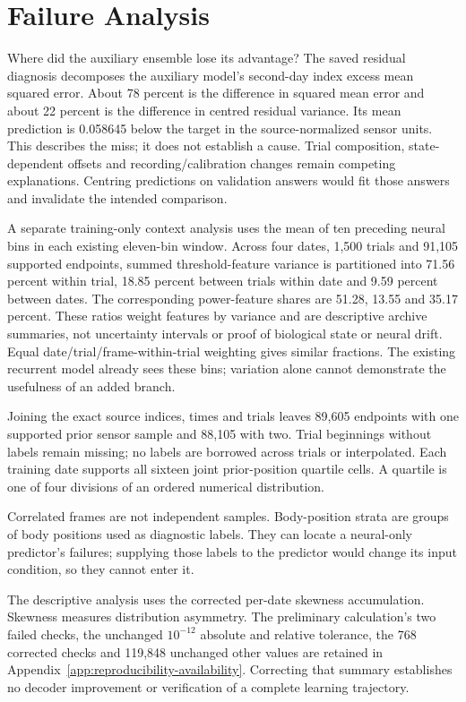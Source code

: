 \section{Failure Analysis}

Where did the auxiliary ensemble lose its advantage? The saved residual diagnosis decomposes the auxiliary model's second-day index
excess mean squared error. About 78 percent is the difference in squared mean
error and about 22 percent is the difference in centred residual variance.
Its mean prediction is 0.058645 below the target in the source-normalized
sensor units. This describes the miss; it does not establish a cause. Trial
composition, state-dependent offsets and recording/calibration changes remain
competing explanations. Centring predictions on validation answers would fit
those answers and invalidate the intended comparison.

A separate training-only context analysis uses the mean of ten preceding neural
bins in each existing eleven-bin window. Across four dates, 1,500 trials and
91,105 supported endpoints, summed threshold-feature variance is partitioned
into 71.56 percent within trial, 18.85 percent between trials within date and
9.59 percent between dates. The corresponding power-feature shares are
51.28, 13.55 and 35.17 percent. These ratios weight features by variance and
are descriptive archive summaries, not uncertainty intervals or proof of
biological state or neural drift. Equal date/trial/frame-within-trial weighting
gives similar fractions. The existing recurrent model already sees these bins;
variation alone cannot demonstrate the usefulness of an added branch.

Joining the exact source indices, times and trials leaves 89,605 endpoints with one supported prior sensor sample and 88,105 with two. Trial beginnings without labels remain missing; no labels are borrowed across trials or interpolated. Each training date supports all sixteen joint prior-position quartile cells. A quartile is one of four divisions of an ordered numerical distribution.

Correlated frames are not independent samples. Body-position strata are groups of body positions used as diagnostic labels. They can locate a neural-only predictor's failures; supplying those labels to the predictor would change its input condition, so they cannot enter it.

The descriptive analysis uses the corrected per-date skewness accumulation. Skewness measures distribution asymmetry. The preliminary calculation's two failed checks, the unchanged $10^{-12}$ absolute and relative tolerance, the 768 corrected checks and 119,848 unchanged other values are retained in Appendix~\ref{app:reproducibility-availability}. Correcting that summary establishes no decoder improvement or verification of a complete learning trajectory.

